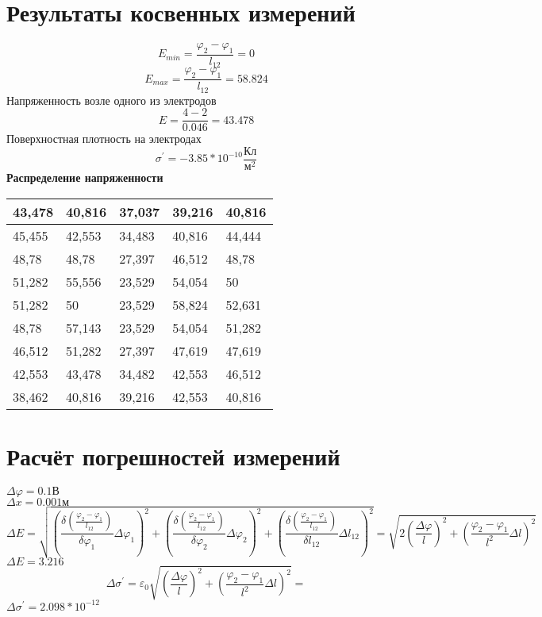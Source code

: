 \documentclass[12pt]{extarticle}
\begin{document}
    \section{Результаты косвенных измерений}
    \begin{equation*}
        E_{min} = \frac{\varphi_2 - \varphi_1}{l_{12}} = 0
    \end{equation*}
    \begin{equation*}
        E_{max} = \frac{\varphi_2 - \varphi_1}{l_{12}} = 58.824
    \end{equation*}
    Напряженность возле одного из электродов
    \begin{equation*}
        E = \frac{4 - 2}{0.046} = 43.478
    \end{equation*}
    Поверхностная плотность на электродах
    \begin{equation*}
        \sigma^\prime = -3.85 * 10^{-10} \frac{\text{Кл}}{\text{м}^2}
    \end{equation*}
    \textbf{Распределение напряженности} \\
    \begin{tabular}{|p{3cm}|p{3cm}|p{3cm}|p{3cm}|p{3cm}|}
        \hline
        43,478 & 40,816 & 37,037 & 39,216 & 40,816 \\ \hline
        45,455 & 42,553 & 34,483 & 40,816 & 44,444 \\ \hline
        48,78  & 48,78  & 27,397 & 46,512 & 48,78  \\ \hline
        51,282 & 55,556 & 23,529 & 54,054 & 50          \\ \hline 
        51,282 & 50     & 23,529 & 58,824 & 52,631 \\ \hline
        48,78  & 57,143 & 23,529 & 54,054 & 51,282 \\ \hline
        46,512 & 51,282 & 27,397 & 47,619 & 47,619 \\ \hline
        42,553 & 43,478 & 34,482 & 42,553 & 46,512 \\ \hline
        38,462 & 40,816 & 39,216 & 42,553 & 40,816 \\ \hline
    \end{tabular}
    
    \section*{Расчёт погрешностей измерений}
    $\Delta \varphi = 0.1\text{В}$ \\
    $\Delta x = 0.001 \text{м}$
    \begin{equation*}
        \Delta E = \sqrt{(\frac{\delta(\frac{\varphi_2 - \varphi_1}{l_{12}})}{\delta\varphi_1}\Delta\varphi_1)^2
         + (\frac{\delta(\frac{\varphi_2 - \varphi_1}{l_{12}})}{\delta\varphi_2}\Delta\varphi_2)^2
         + (\frac{\delta(\frac{\varphi_2 - \varphi_1}{l_{12}})}{\delta l_{12}}\Delta l_{12})^2} =
         \sqrt{2(\frac{\Delta\varphi}{l})^2 + (\frac{\varphi_2 - \varphi_1}{l^2}\Delta l)^2}
    \end{equation*}
    $\Delta E = 3.216$
    \begin{equation*}
        \Delta\sigma^\prime = \varepsilon_0\sqrt{(\frac{\Delta\varphi}{l})^2 + (\frac{\varphi_2 - \varphi_1}{l^2}\Delta l)^2} = 
    \end{equation*}
    $\Delta\sigma^\prime = 2.098 * 10^{-12}$
\end{document}
